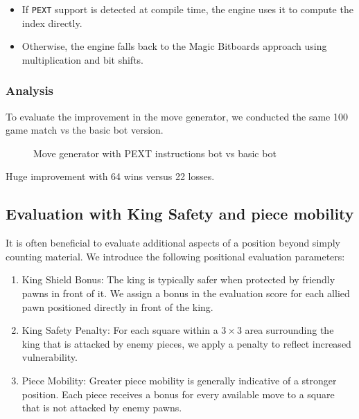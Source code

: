 \begin{itemize}
  \item If \texttt{PEXT} support is detected at compile time, the engine uses it to compute the index directly.
  \item Otherwise, the engine falls back to the Magic Bitboards approach using multiplication and bit shifts.
\end{itemize}

\subsubsection{Analysis}

To evaluate the improvement in the move generator, we conducted the same 
100 game match vs the basic bot version.

\begin{center}
    \begin{figure}[H]
        \centering
        \caption{Move generator with PEXT instructions bot vs basic bot}
        \label{fig:results_pext_move_generator_bot}
    \end{figure}
\medskip
\end{center}

\noindent Huge improvement with 64 wins versus 22 losses.

\subsection{Evaluation with King Safety and piece mobility}

It is often beneficial to evaluate additional aspects of a position beyond simply counting material. We introduce the following positional evaluation parameters:

\begin{enumerate}
    \item King Shield Bonus: The king is typically safer when protected by friendly pawns in front of it. We assign a bonus in the evaluation score for each allied pawn positioned directly in front of the king.

    \item King Safety Penalty: For each square within a $3 \times 3$ area surrounding the king that is attacked by enemy pieces, we apply a penalty to reflect increased vulnerability.

    \item Piece Mobility: Greater piece mobility is generally indicative of a stronger position. Each piece receives a bonus for every available move to a square that is not attacked by enemy pawns.
\end{enumerate}

